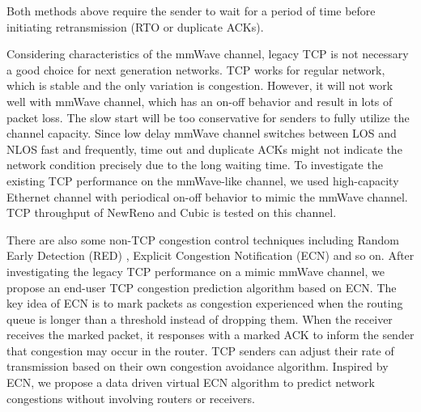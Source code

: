 Both methods above require the sender to wait for a period of time before initiating retransmission (RTO or duplicate ACKs). 
\par Considering characteristics of the mmWave channel, legacy TCP is not necessary a good choice for next generation networks. TCP works for regular network, which is stable and the only variation is congestion. However, it will not work well with mmWave channel, which has an on-off behavior and result in lots of packet loss. The slow start will be too conservative for senders to fully utilize the channel capacity. Since low delay mmWave channel switches between LOS and NLOS fast and frequently, time out and duplicate ACKs might not indicate the network condition precisely due to the long waiting time. To investigate the existing TCP performance on the mmWave-like channel, we used high-capacity Ethernet channel with periodical on-off behavior to mimic the mmWave channel. TCP throughput of NewReno and Cubic \cite{grieco2004performance, ha2008cubic} is tested on this channel. 
\par There are also some non-TCP congestion control techniques including Random Early Detection (RED) \cite{lin1997dynamics}, Explicit Congestion Notification (ECN) \cite{ramakrishnan2001rfc} and so on. After investigating the legacy TCP performance on a mimic mmWave channel, we propose an end-user TCP congestion prediction algorithm based on ECN. The key idea of ECN is to mark packets as congestion experienced when the routing queue is longer than a threshold instead of dropping them. When the receiver receives the marked packet, it responses with a marked ACK to inform the sender that congestion may occur in the router. TCP senders can adjust their rate of transmission based on their own congestion avoidance algorithm. Inspired by ECN, we propose a data driven virtual ECN algorithm to predict network congestions without involving routers or receivers.
